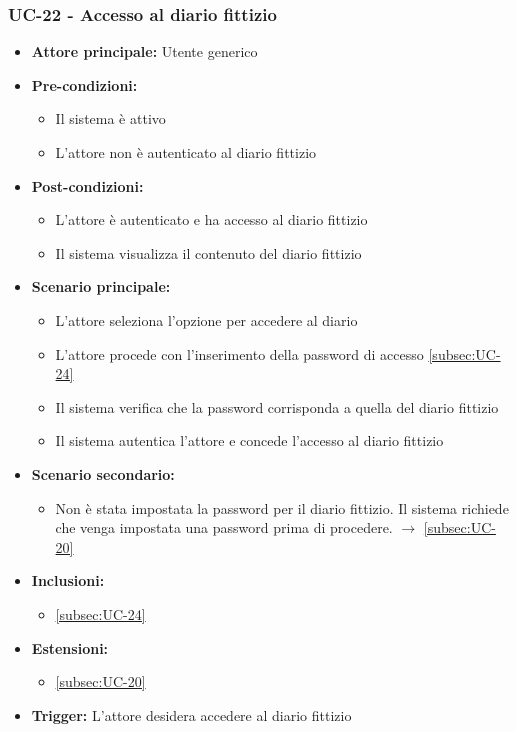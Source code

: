 \documentclass[a4paper,12pt]{article}
\begin{document}
\subsubsection{UC-22 - Accesso al diario fittizio} \label{subsec:UC-22}
\begin{itemize}
    \item \textbf{Attore principale:} Utente generico
    \item \textbf{Pre-condizioni:}
    \begin{itemize}
        \item Il sistema è attivo
        \item L'attore non è autenticato al diario fittizio
    \end{itemize}
    \item \textbf{Post-condizioni:} 
    \begin{itemize}
        \item L'attore è autenticato e ha accesso al diario fittizio
        \item Il sistema visualizza il contenuto del diario fittizio
    \end{itemize}
    \item \textbf{Scenario principale:} 
    \begin{itemize}
        \item L'attore seleziona l'opzione per accedere al diario
        \item L'attore procede con l'inserimento della password di accesso \ref{subsec:UC-24}
        \item Il sistema verifica che la password corrisponda a quella del diario fittizio
        \item Il sistema autentica l'attore e concede l'accesso al diario fittizio
    \end{itemize}
    \item \textbf{Scenario secondario:} 
    \begin{itemize}
        \item Non è stata impostata la password per il diario fittizio. Il sistema richiede che venga impostata una password prima di procedere. $\rightarrow$ \ref{subsec:UC-20}
    \end{itemize}
    \item \textbf{Inclusioni:}
    \begin{itemize}
        \item \ref{subsec:UC-24}
    \end{itemize}
    \item \textbf{Estensioni:}
    \begin{itemize}
        \item \ref{subsec:UC-20}
    \end{itemize}
    \item \textbf{Trigger:} L'attore desidera accedere al diario fittizio
\end{itemize}
\end{document}
